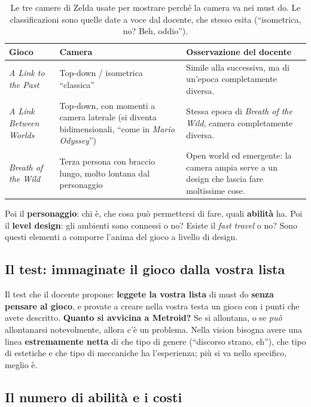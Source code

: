 \begin{table}[htbp]
  \centering
  \small
  \begin{tabular}{@{}p{}p{}p{}@{}}
    \toprule
    \textbf{Gioco} & \textbf{Camera} & \textbf{Osservazione del docente} \\
    \midrule
    \emph{A Link to the Past} & Top-down / isometrica ``classica'' &
      Simile alla successiva, ma di un'epoca completamente diversa. \\
    \emph{A Link Between Worlds} & Top-down, con momenti a camera laterale
      (si diventa bidimensionali, ``come in \emph{Mario Odyssey}'') &
      Stessa epoca di \emph{Breath of the Wild}, camera completamente
      diversa. \\
    \emph{Breath of the Wild} & Terza persona con braccio lungo, molto
      lontana dal personaggio & Open world ed emergente: la camera ampia
      serve a un design che lascia fare moltissime cose. \\
    \bottomrule
  \end{tabular}
  \caption{Le tre camere di Zelda usate per mostrare perché la camera va nei
  must do. Le classificazioni sono quelle date a voce dal docente, che
  stesso esita (``isometrica, no? Beh, oddio'').}
  \label{gd15:tab:zelda}
\end{table}

Poi il \textbf{personaggio}: chi è, che cosa può permettersi di fare, quali
\textbf{abilità} ha. Poi il \textbf{level design}: gli ambienti sono connessi
o no? Esiste il \emph{fast travel} o no? Sono questi elementi a comporre
l'anima del gioco a livello di design.

\subsection{Il test: immaginate il gioco dalla vostra lista}

Il test che il docente propone: \textbf{leggete la vostra lista} di must do
\textbf{senza pensare al gioco}, e provate a creare nella vostra testa un
gioco con i punti che avete descritto. \textbf{Quanto si avvicina a
Metroid?} Se si allontana, o se \emph{può} allontanarsi notevolmente,
allora c'è un problema. Nella vision bisogna avere una linea
\textbf{estremamente netta} di che tipo di genere (``discorso strano,
eh''), che tipo di estetiche e che tipo di meccaniche ha l'esperienza; più
si va nello specifico, meglio è.

\subsection{Il numero di abilità e i costi}

